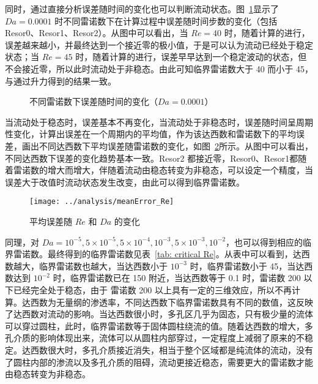 同时，通过直接分析误差随时间的变化也可以判断流动状态。图~\ref{fig: resd}显示了 $Da=0.0001$ 时不同雷诺数下在计算过程中误差随时间步数的变化（包括 Resor0、Resor1、Resor2）。从图中可以看出，当 $Re=40$ 时，随着计算的进行，误差越来越小，并最终达到一个接近零的极小值，于是可以认为流动已经处于稳定状态；当 $Re=45$ 时，随着计算的进行，误差早早达到一个稳定波动的状态，但不会接近零，所以此时流动处于非稳态。由此可知临界雷诺数大于 40 而小于 45，与通过升力得到的结果一致。

\begin{figure}
	\centering
	\begin{minipage}{\textwidth}
		\centering
	\end{minipage}
	\centering
	\begin{minipage}{\textwidth}
		\centering
	\end{minipage}
	\caption{不同雷诺数下误差随时间的变化（$Da=0.0001$）}
	\label{fig: resd}
\end{figure}

当流动处于稳态时，误差基本不再变化，当流动处于非稳态时，误差随时间呈周期性变化，计算出误差在一个周期内的平均值，作为该达西数和雷诺数下的平均误差，画出不同达西数下平均误差随雷诺数的变化，如图~\ref{fig: error}所示。从图中可以看出，不同达西数下误差的变化趋势基本一致。Resor2 都接近零，Resor0、Resor1都随着雷诺数的增大而增大，伴随着流动由稳态转变为非稳态，可以设定一个精度，当误差大于改值时流动状态发生改变，由此可以得到临界雷诺数。

\begin{figure}
	\centering
	\texttt{[image: ../analysis/meanError\_Re]}
	\caption{平均误差随 $Re$ 和 $Da$ 的变化}
	\label{fig: error}
\end{figure}

同理，对 $Da=10^{-5},5\times 10^{-5},5\times 10^{-4},10^{-3},5\times 10^{-3},10^{-2}$，也可以得到相应的临界雷诺数。最终得到的临界雷诺数见表~\ref{tab: critical Re}。从表中可以看到，达西数越大，临界雷诺数也越大，当达西数小于 $10^{-3}$ 时，临界雷诺数小于 45，当达西数达到 $10^{-2}$ 时，临界雷诺数已在 150 附近，当达西数等于 0.1 时，雷诺数 200 以下已经完全处于稳态，由于 雷诺数 200 以上具有一定的三维效应，所以不再计算。达西数为无量纲的渗透率，不同达西数下临界雷诺数具有不同的数值，这反映了达西数对流动的影响。当达西数很小时，多孔区几乎为固态，只有极少量的流体可以穿过圆柱，此时，临界雷诺数等于固体圆柱绕流的值。随着达西数的增大，多孔介质的影响体现出来，流体可以从圆柱内部穿过，一定程度上减弱了原来的不稳定。达西数很大时，多孔介质接近消失，相当于整个区域都是纯流体的流动，没有了圆柱内部的渗流以及多孔介质的阻碍，流动更接近稳态，需要更大的雷诺数才能由稳态转变为非稳态。

